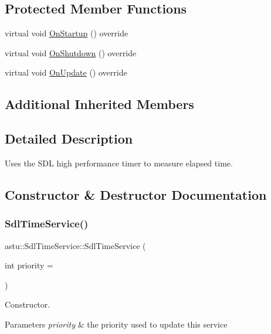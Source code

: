 \subsection*{Protected Member Functions}
\begin{DoxyCompactItemize}
\item 
virtual void \hyperlink{classastu_1_1SdlTimeService_ac11551691bb14289020028a2a162c7d6}{On\+Startup} () override
\item 
virtual void \hyperlink{classastu_1_1SdlTimeService_a6a1b864beed186413933dd8b97a393a2}{On\+Shutdown} () override
\item 
virtual void \hyperlink{classastu_1_1SdlTimeService_ada8347f0f665616a2202919e71b76302}{On\+Update} () override
\end{DoxyCompactItemize}
\subsection*{Additional Inherited Members}


\subsection{Detailed Description}
Uses the S\+DL high performance timer to measure elapsed time. 

\subsection{Constructor \& Destructor Documentation}
\mbox{\label{classastu_1_1SdlTimeService_a66fa9afe98778d34ab4f2a92ba6ded40}} 
\subsubsection{\texorpdfstring{Sdl\+Time\+Service()}{SdlTimeService()}}
{\footnotesize\ttfamily astu\+::\+Sdl\+Time\+Service\+::\+Sdl\+Time\+Service (\begin{DoxyParamCaption}\item[{int}]{priority = {} }\end{DoxyParamCaption})}

Constructor.


\begin{DoxyParams}{Parameters}
{\em priority} & the priority used to update this service \\
\hline
\end{DoxyParams}
\mbox{\label{classastu_1_1SdlTimeService_a2e7171a77afc5bf3a051eba2b583ea8a}} 
